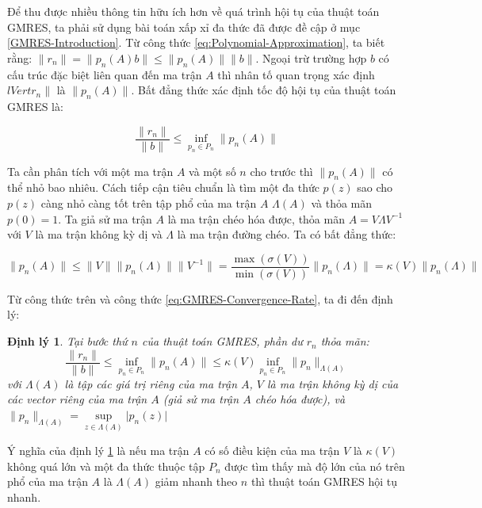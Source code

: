 \documentclass[14pt, a4paper]{article}
\numberwithin{equation}{section}
\numberwithin{algorithm}{section}
\numberwithin{figure}{section}
\newtheorem{dl}{Định lý}
\numberwithin{dl}{section}
\numberwithin{md}{section}
\numberwithin{bd}{section}
\begin{document}
Để thu được nhiều thông tin hữu ích hơn về quá trình hội tụ của thuật toán GMRES, ta phải sử dụng bài toán xấp xỉ đa thức đã được đề cập ở mục \ref{GMRES-Introduction}. Từ công thức \ref{eq:Polynomial-Approximation}, ta biết rằng: $\lVert r_n \rVert=\lVert p_n(A)b \rVert \leq \lVert p_n(A) \rVert \lVert b \rVert$. Ngoại trừ trường hợp $b$ có cấu trúc đặc biệt liên quan đến ma trận $A$ thì nhân tố quan trọng xác định $lVert r_n \rVert$ là $\lVert p_n(A) \rVert$. Bất đẳng thức xác định tốc độ hội tụ của thuật toán GMRES là:

\begin{equation} \label{eq:GMRES-Convergence-Rate}
    \dfrac{\lVert r_n \rVert}{\lVert b \rVert} \leq \inf_{p_n \in P_n} \lVert p_n(A) \rVert
\end{equation}

Ta cần phân tích với một ma trận $A$ và một số $n$ cho trước thì $\lVert p_n(A) \rVert$ có thể nhỏ bao nhiêu. Cách tiếp cận tiêu chuẩn là tìm một đa thức $p(z)$ sao cho $p(z)$ càng nhỏ càng tốt trên tập phổ của ma trận $A$ $\Lambda(A)$ và thỏa mãn $p(0)=1$. Ta giả sử ma trận $A$ là ma trận chéo hóa được, thỏa mãn $A=V\Lambda V^{-1}$ với $V$ là ma trận không kỳ dị và $\Lambda$ là ma trận đường chéo. Ta có bất đẳng thức:

\begin{equation}
    \lVert p_n(A) \rVert \leq \lVert V \rVert \lVert p_n(\Lambda) \rVert \lVert V^{-1} \rVert = \dfrac{\max(\sigma(V))}{\min(\sigma(V))} \lVert p_n(\Lambda) \rVert = \kappa(V) \lVert p_n(\Lambda) \rVert
\end{equation}

Từ công thức trên và công thức \ref{eq:GMRES-Convergence-Rate}, ta đi đến định lý:

\begin{dl} \label{dl:GMRES-Convergence-Rate}
    Tại bước thứ $n$ của thuật toán GMRES, phần dư $r_n$ thỏa mãn:
    \begin{equation}
        \dfrac{\lVert r_n \rVert}{\lVert b \rVert} \leq \inf_{p_n \in P_n} \lVert p_n(A) \rVert \leq \kappa(V) \inf_{p_n \in P_n} \lVert p_n \rVert_{\Lambda(A)}
    \end{equation}
    với $\Lambda(A)$ là tập các giá trị riêng của ma trận $A$, $V$ là ma trận không kỳ dị của các vector riêng của ma trận $A$ (giả sử ma trận $A$ chéo hóa được), và $\lVert p_n \rVert_{\Lambda(A)}=\underset{z \in \Lambda(A)}{\sup} \lvert p_n(z) \rvert$
\end{dl}

Ý nghĩa của định lý \ref{dl:GMRES-Convergence-Rate} là nếu ma trận $A$ có số điều kiện của ma trận $V$ là $\kappa(V)$ không quá lớn và một đa thức thuộc tập $P_n$ được tìm thấy mà độ lớn của nó trên phổ của ma trận $A$ là $\Lambda(A)$ giảm nhanh theo $n$ thì thuật toán GMRES hội tụ nhanh.
\end{document}
